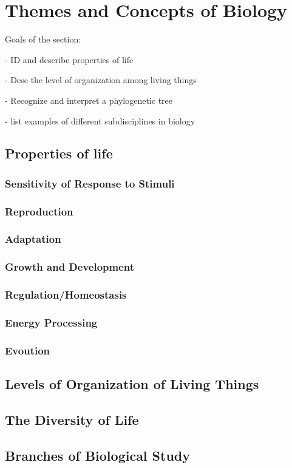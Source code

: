 \documentclass{article}
\theoremstyle{definition}
\begin{document}
\section{Themes and Concepts of Biology}
Goals of the section:

- ID and describe properties of life

- Desc the level of organization among living things

- Recognize and interpret a phylogenetic tree

- list examples of different subdisciplines in biology

\subsection{Properties of life}

\subsubsection{Sensitivity of Response to Stimuli}

\subsubsection{Reproduction}

\subsubsection{Adaptation}

\subsubsection{Growth and Development}

\subsubsection{Regulation/Homeostasis}

\subsubsection{Energy Processing}

\subsubsection{Evoution}

\subsection{Levels of Organization of Living  Things}

\subsection{The Diversity of Life}

\subsection{Branches of Biological Study}
\end{document}
